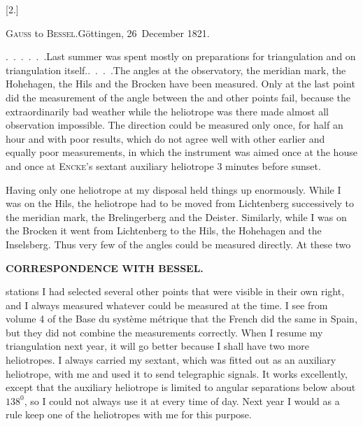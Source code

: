 \begin{center}
[2.]\par\medskip
\textsc{Gauss} to \textsc{Bessel}.\quad Göttingen, 26~December 1821.
\end{center}

\par\noindent\hspace*{\parindent}.\ .\ .\ .\ .\ .\quad Last summer was spent mostly on preparations for triangulation and on triangulation itself.\quad.\ .\ .\ .\quad The angles at the observatory, the meridian mark, the Hohehagen, the Hils and the Brocken have been measured. Only at the last point did the measurement of the angle between the  and other points fail, because the extraordinarily bad weather while the heliotrope was there made almost all observation impossible.
The direction could be measured only once, for half an hour and with poor results, which do not agree well with other earlier and equally poor measurements, in which the instrument was aimed once at the house and once at \textsc{Encke}'s sextant auxiliary heliotrope 3 minutes before sunset.

\par\noindent\hspace*{\parindent}Having only one heliotrope at my disposal held things up enormously.
While I was on the Hils, the heliotrope had to be moved from Lichtenberg successively to the meridian mark, the Brelingerberg and the Deister. Similarly, while I was on the Brocken it went from Lichtenberg to the Hils, the Hohehagen and the Inselsberg.
Thus very few of the angles could be measured directly. At these two
\par\clearpage
{}\hfill{\small\textbf{CORRESPONDENCE WITH BESSEL.}}\par\medskip
\noindent stations I had selected several other points that were visible in their own right, and I always measured whatever could be measured at the time.
I see from volume 4 of the Base du système métrique that the French did the same in Spain, but they did not combine the measurements correctly.
When I resume my triangulation next year, it will go better because I shall have two more heliotropes.
I always carried my sextant, which was fitted out as an auxiliary heliotrope, with me and used it to send telegraphic signals.
It works excellently, except that the auxiliary heliotrope is limited to angular separations below about \(138^{0}\), so I could not always use it at every time of day. Next year I would as a rule keep one of the heliotropes with me for this purpose.

